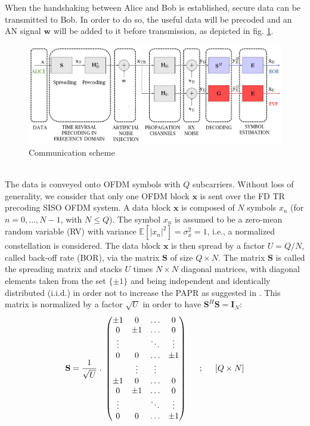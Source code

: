\documentclass[journal,comsoc]{IEEEtran}
\let\MYoriglatexcaption\caption
\renewcommand{\caption}[2][\relax]{\MYoriglatexcaption[#2]{#2}}
\newcommand{\EX}[1]{\mathbb{E} \left[#1\right]}%
\newcommand{\spread}{\textbf{S}}
\newcommand{\w}{\textbf{w}}
\begin{document}
When the handshaking between Alice and Bob is established, secure data can be transmitted to Bob. In order to do so, the useful data will be precoded and an AN signal $\w$ will be added to it before transmission, as depicted in fig. \ref{fig_com_scheme}.  
\begin{figure}[h!t]
	\centering
	\includegraphics[width=1\linewidth]{graphs/com_scheme_an.PNG}
	\caption{Communication scheme}
	\label{fig_com_scheme}
\end{figure}\\
The data is conveyed onto OFDM symbols with $Q$ subcarriers. Without loss of generality, we consider that only one OFDM block $\textbf{x}$ is sent over the FD TR precoding SISO OFDM system. A data block $\textbf{x}$ is composed of $N$ symbols $x_n$ (for $n = 0,..., N-1$, with $N\leq Q$). The symbol $x_n$ is assumed to be a zero-mean random variable (RV) with variance $\EX{|x_n|^2} = \sigma_x^2 = 1$, i.e., a normalized constellation is considered. The data block $\textbf{x}$ is then spread by a factor $U = Q/N$, called back-off rate (BOR), via the matrix $\spread$ of size $Q\times N$. The matrix $\spread$ is called the spreading matrix and stacks $U$ times $N\times N$ diagonal matrices, with diagonal elements taken from the set $\{\pm1\}$ and being independent and identically distributed (i.i.d.) in order not to increase the PAPR as suggested in \cite{4394231}. 
This matrix is normalized by a factor $\sqrt{U}$ in order to have $\spread^H \spread = \textbf{I}_N$:
\begin{equation}
\spread= \frac{1}{\sqrt{U}} \; . \;
\begin{pmatrix}
\pm 1 & 0 & \hdots & 0 \\
0 & \pm 1 & \hdots & 0 \\
\vdots & & \ddots & \vdots \\
0 & 0 & \hdots & \pm 1 \\
& \vdots& \vdots& \\
\pm 1 & 0 & \hdots & 0 \\
0 & \pm 1 & \hdots & 0 \\
\vdots & & \ddots & \vdots \\
0 & 0 & \hdots & \pm 1
\end{pmatrix}
\hspace{.2in} ; \hspace{.2in} [Q \times N]
\label{eq:spread_mat}
\end{equation}
\end{document}
